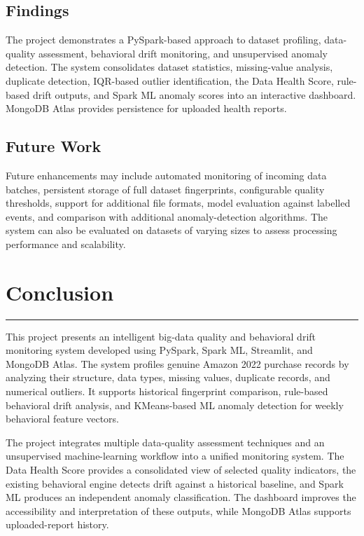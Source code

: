 \documentclass[12pt,a4paper]{report}
\begin{document}
\section{Findings}

The project demonstrates a PySpark-based approach to dataset profiling, data-quality assessment, behavioral drift monitoring, and unsupervised anomaly detection. The system consolidates dataset statistics, missing-value analysis, duplicate detection, IQR-based outlier identification, the Data Health Score, rule-based drift outputs, and Spark ML anomaly scores into an interactive dashboard. MongoDB Atlas provides persistence for uploaded health reports.

\section{Future Work}

Future enhancements may include automated monitoring of incoming data batches, persistent storage of full dataset fingerprints, configurable quality thresholds, support for additional file formats, model evaluation against labelled events, and comparison with additional anomaly-detection algorithms. The system can also be evaluated on datasets of varying sizes to assess processing performance and scalability.




\chapter{Conclusion}
\rule{\textwidth}{2pt}

This project presents an intelligent big-data quality and behavioral drift monitoring system developed using PySpark, Spark ML, Streamlit, and MongoDB Atlas. The system profiles genuine Amazon 2022 purchase records by analyzing their structure, data types, missing values, duplicate records, and numerical outliers. It supports historical fingerprint comparison, rule-based behavioral drift analysis, and KMeans-based ML anomaly detection for weekly behavioral feature vectors.

The project integrates multiple data-quality assessment techniques and an unsupervised machine-learning workflow into a unified monitoring system. The Data Health Score provides a consolidated view of selected quality indicators, the existing behavioral engine detects drift against a historical baseline, and Spark ML produces an independent anomaly classification. The dashboard improves the accessibility and interpretation of these outputs, while MongoDB Atlas supports uploaded-report history.
\end{document}
